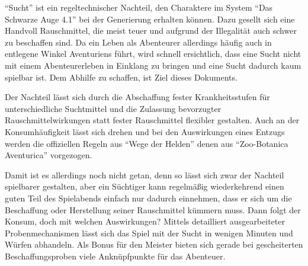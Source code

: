 \enquote{Sucht} ist ein regeltechnischer Nachteil, den Charaktere im System \enquote{Das Schwarze Auge 4.1} bei der Generierung erhalten können. Dazu gesellt sich eine Handvoll Rauschmittel, die meist teuer und aufgrund der Illegalität auch schwer zu beschaffen sind. Da ein Leben als Abenteurer allerdings häufig auch in entlegene Winkel Aventuriens führt, wird schnell ersichtlich, dass eine Sucht nicht mit einem Abenteurerleben in Einklang zu bringen und eine Sucht dadurch kaum spielbar ist. Dem Abhilfe zu schaffen, ist Ziel dieses Dokuments.

Der Nachteil lässt sich durch die Abschaffung fester Krankheitsstufen für unterschiedliche Suchtmittel und die Zulassung bevorzugter Rauschmittelwirkungen statt fester Rauschmittel flexibler gestalten. Auch an der Konsumhäufigkeit lässt sich drehen und bei den Auswirkungen eines Entzugs werden die offiziellen Regeln aus \enquote{Wege der Helden} denen aus \enquote{Zoo-Botanica Aventurica} vorgezogen.

Damit ist es allerdings noch nicht getan, denn so lässt sich zwar der Nachteil spielbarer gestalten, aber ein Süchtiger kann regelmäßig wiederkehrend einen guten Teil des Spielabends einfach nur dadurch einnehmen, dass er sich um die Beschaffung oder Herstellung seiner Rauschmittel kümmern muss. Dann folgt der Konsum, doch mit welchen Auswirkungen? Mittels detailliert ausgearbeiteter Probenmechanismen lässt sich das Spiel mit der Sucht in wenigen Minuten und Würfen abhandeln. Als Bonus für den Meister bieten sich gerade bei gescheiterten Beschaffungsproben viele Anknüpfpunkte für das Abenteuer.
